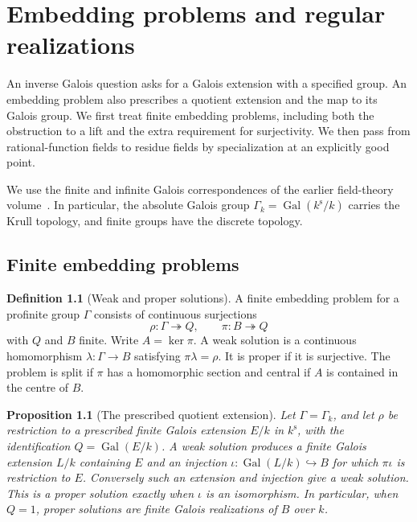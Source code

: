 \documentclass[11pt,oneside,openany]{book}
\newtheorem{proposition}[theorem]{Proposition}
\theoremstyle{definition}
\newtheorem{definition}[theorem]{Definition}
\theoremstyle{remark}
\begin{document}
\chapter{Embedding problems and regular realizations}
\label{ch:inverse-galois}

An inverse Galois question asks for a Galois extension with a specified
group. An embedding problem also prescribes a quotient extension and
the map to its Galois group. We first treat finite embedding problems,
including both the obstruction to a lift and the extra requirement for
surjectivity. We then pass from rational-function fields to residue
fields by specialization at an explicitly good point.

We use the finite and infinite Galois correspondences of
the earlier field-theory volume~\cite[Results F01, F07, T02,
C04, C06, C08--C10]{mg-aft}. In particular, the absolute Galois
group \(\Gamma_k=\operatorname{Gal}(k^{\mathrm{s}}/k)\) carries
the Krull topology, and finite groups have the discrete topology.

\section{Finite embedding problems}

\begin{definition}[Weak and proper solutions]
\label{res:IG01}
A finite embedding problem for a profinite group \(\Gamma\)
consists of continuous surjections
\[
   \rho\colon\Gamma\twoheadrightarrow Q,\qquad
   \pi\colon B\twoheadrightarrow Q
\]
with \(Q\) and \(B\) finite. Write \(A=\ker\pi\). A weak solution is
a continuous homomorphism \(\lambda\colon\Gamma\to B\) satisfying
\(\pi\lambda=\rho\). It is proper if it is surjective. The problem is
split if \(\pi\) has a homomorphic section and central if \(A\) is
contained in the centre of \(B\).
\end{definition}

\begin{proposition}[The prescribed quotient extension]
\label{res:IG02}
Let \(\Gamma=\Gamma_k\), and let \(\rho\) be restriction to a prescribed
finite Galois extension \(E/k\) in \(k^{\mathrm{s}}\), with the
identification \(Q=\operatorname{Gal}(E/k)\). A weak solution produces
a finite Galois extension \(L/k\) containing \(E\) and an injection
\(\iota\colon\operatorname{Gal}(L/k)\hookrightarrow B\) for which
\(\pi\iota\) is restriction to \(E\). Conversely such an extension
and injection give a weak solution. This is a proper solution exactly
when \(\iota\) is an isomorphism. In particular, when \(Q=1\),
proper solutions are finite Galois realizations of \(B\) over \(k\).
\end{proposition}
\end{document}
